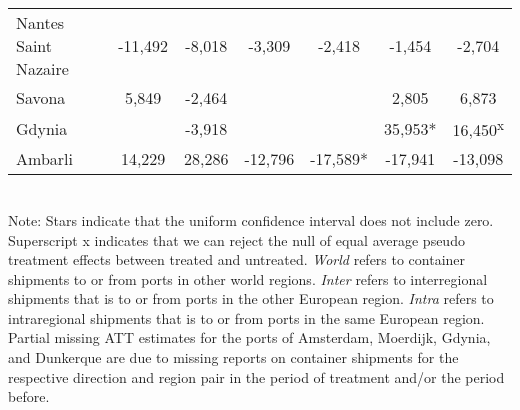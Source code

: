 \begin{table}[ht]
\begin{adjustbox}{max width=\textwidth}
\begin{tabular}{lcccccc}
  Nantes Saint Nazaire & -11,492 &  -8,018 &  -3,309 &  -2,418 &  -1,454 &  -2,704 \\ 
  Savona &   5,849 &  -2,464 &  &  &   2,805 &   6,873 \\ 
  Gdynia &  &  -3,918 &  &  &  35,953* &  16,450\textsuperscript{x} \\ 
  Ambarli &  14,229 &  28,286 & -12,796 & -17,589* & -17,941 & -13,098 \\ 
   [2ex] \hline \hline\end{tabular} 
 \end{adjustbox} \label{tab:did_reshuffling}
\begin{minipage}{15cm} \\
\footnotesize Note: Stars indicate that the uniform confidence interval does not include zero. Superscript x indicates that we can reject the null of equal average pseudo treatment effects between treated and untreated. \textit{World} refers to container shipments to or from ports in other world regions. \textit{Inter} refers to interregional shipments that is to or from ports in the other European region. \textit{Intra} refers to intraregional shipments that is to or from ports in the same European region. Partial missing ATT estimates for the ports of Amsterdam, Moerdijk, Gdynia, and Dunkerque are due to missing reports on container shipments for the respective direction and region pair in the period of treatment and/or the period before. \\
\end{minipage}
\endgroup
\end{table}
